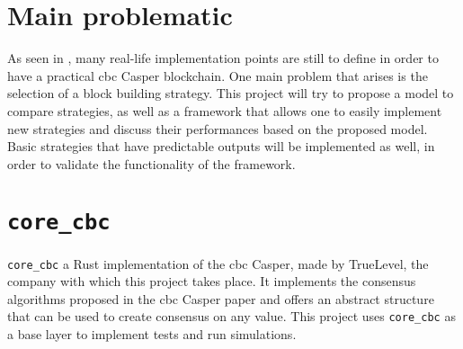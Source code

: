 \begin{table}[H]
\end{table}

\section{Main problematic}
As seen in , many real-life implementation points are still
to define in order to have a practical \gls{cbc} Casper blockchain. One main
problem that arises is the selection of a block building strategy. This project
will try to propose a model to compare strategies, as well as a framework that
allows one to easily implement new strategies and discuss their performances
based on the proposed model.  Basic strategies that have predictable outputs
will be implemented as well, in order to validate the functionality of the
framework.

\section{\texttt{core\_cbc}}
\texttt{core\_cbc} a Rust implementation of the \gls{cbc} Casper, made by
TrueLevel, the company with which this project takes place. It implements the
consensus algorithms proposed in the \gls{cbc} Casper paper and offers an
abstract structure that can be used to create consensus on any value. This
project uses \texttt{core\_cbc} as a base layer to implement tests and run
simulations.

